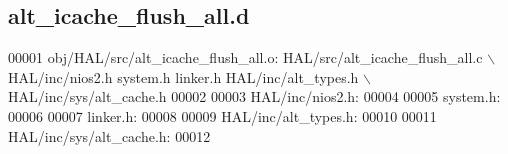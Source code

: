 \subsection{alt\+\_\+icache\+\_\+flush\+\_\+all.\+d}
\label{alt__icache__flush__all_8d_source}

\begin{DoxyCode}
00001 obj/HAL/src/alt_icache_flush_all.o: HAL/src/alt_icache_flush_all.c \(\backslash\)
 HAL/inc/nios2.h system.h linker.h HAL/inc/alt\_types.h \(\backslash\)
 HAL/inc/sys/alt\_cache.h
00002 
00003 HAL/inc/nios2.h:
00004 
00005 system.h:
00006 
00007 linker.h:
00008 
00009 HAL/inc/alt\_types.h:
00010 
00011 HAL/inc/sys/alt\_cache.h:
00012 \end{DoxyCode}
